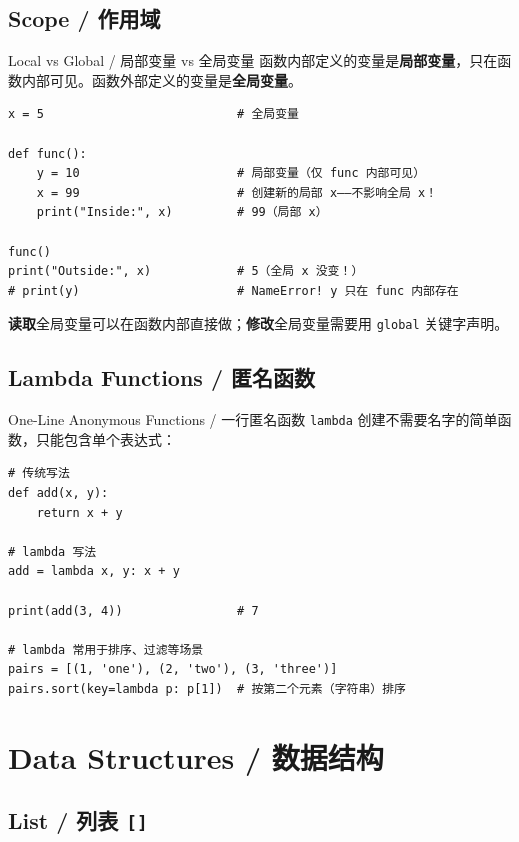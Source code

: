 \documentclass[11pt,a4paper]{report}
\let\oldtexttt\texttt
\renewcommand{\texttt}[1]{\textcolor{mainblue}{\oldtexttt{#1}}}
\begin{document}
\section{Scope / 作用域}

\begin{concept}{Local vs Global / 局部变量 vs 全局变量}
函数内部定义的变量是\textbf{局部变量}，只在函数内部可见。函数外部定义的变量是\textbf{全局变量}。
\begin{lstlisting}
x = 5                           # 全局变量

def func():
    y = 10                      # 局部变量（仅 func 内部可见）
    x = 99                      # 创建新的局部 x——不影响全局 x！
    print("Inside:", x)         # 99（局部 x）

func()
print("Outside:", x)            # 5（全局 x 没变！）
# print(y)                      # NameError! y 只在 func 内部存在
\end{lstlisting}
\textbf{读取}全局变量可以在函数内部直接做；\textbf{修改}全局变量需要用 \texttt{global} 关键字声明。
\end{concept}

\section{Lambda Functions / 匿名函数}

\begin{concept}{One-Line Anonymous Functions / 一行匿名函数}
\texttt{lambda} 创建不需要名字的简单函数，只能包含单个表达式：
\begin{lstlisting}
# 传统写法
def add(x, y):
    return x + y

# lambda 写法
add = lambda x, y: x + y

print(add(3, 4))                # 7

# lambda 常用于排序、过滤等场景
pairs = [(1, 'one'), (2, 'two'), (3, 'three')]
pairs.sort(key=lambda p: p[1])  # 按第二个元素（字符串）排序
\end{lstlisting}
\end{concept}

\newpage

\chapter{Data Structures / 数据结构}

\section{List / 列表 \texttt{[]}}
\end{document}
